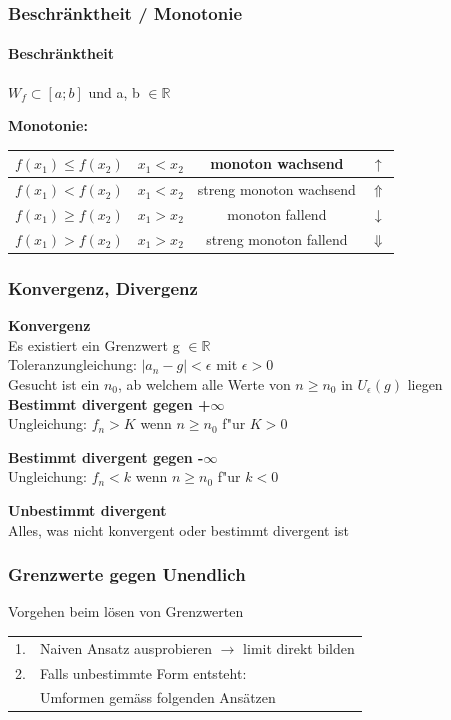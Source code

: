 		\subsubsection{Beschränktheit / Monotonie}
			\paragraph{Beschränktheit}
				$W_f \subset [a ; b]$ und a, b $\in \mathbb{R}$		
			
			\textbf{Monotonie:} \\
			
			\begin{tabular}{|c|c|c|c|}
				\hline
				$f(x_1) \leq f(x_2)$ & $x_1 < x_2$ & monoton wachsend & $\uparrow$\\
				\hline
				$f(x_1) < f(x_2)$ & $x_1 < x_2$ & streng monoton wachsend & $\Uparrow$\\
				\hline
				$f(x_1) \geq f(x_2)$ & $x_1 > x_2$ & monoton fallend & $\downarrow$\\
				\hline
				$f(x_1) > f(x_2)$ & $x_1 > x_2$ & streng monoton fallend & $\Downarrow$\\
				\hline
			\end{tabular}
			
		\subsubsection{Konvergenz, Divergenz}
			\textbf{Konvergenz} \\
				Es existiert ein Grenzwert g $\in \mathbb{R}$ \\
				Toleranzungleichung: $\vert a_n - g \vert < \epsilon$  mit $\epsilon > 0$ \\
				Gesucht ist ein $n_0$, ab welchem alle Werte von $n \geq n_0$ in $U_\epsilon(g)$ liegen \\
				
			\textbf{Bestimmt divergent gegen +$\infty$} \\
				Ungleichung: $f_n > K$ wenn $n \geq  n_0$ f"ur $K > 0$ 
				
			\textbf{Bestimmt divergent gegen -$\infty$} \\
				Ungleichung: $f_n < k$ wenn $n \geq  n_0$ f"ur $k < 0$ 
				
			\textbf{Unbestimmt divergent} \\
				Alles, was nicht konvergent oder bestimmt divergent ist
				
		\subsubsection{Grenzwerte gegen Unendlich}
			Vorgehen beim lösen von Grenzwerten \\
				\begin{tabular}{ll}
					1. & Naiven Ansatz ausprobieren $\rightarrow$ limit direkt bilden \\
					2. & Falls unbestimmte Form entsteht: \\
					   & Umformen gemäss folgenden Ansätzen \\
				\end{tabular}
				
